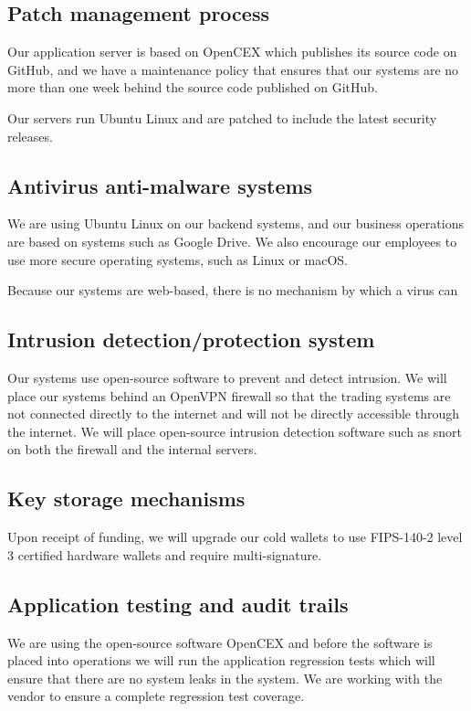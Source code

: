 \subsection{Patch management process}

Our application server is based on OpenCEX which publishes its
source code on GitHub, and we have a maintenance policy that ensures
that our systems are no more than one week behind the source code
published on GitHub.

Our servers run Ubuntu Linux and are patched to include the latest
security releases.

\subsection{Antivirus anti-malware systems}

We are using Ubuntu Linux on our backend systems, and our business
operations are based on systems such as Google Drive.  We also
encourage our employees to use more secure operating systems, such as
Linux or macOS.

Because our systems are web-based, there is no mechanism by which a
virus can 

\subsection{Intrusion detection/protection system}

Our systems use open-source software to prevent and detect intrusion.
We will place our systems behind an OpenVPN firewall so that the
trading systems are not connected directly to the internet and will
not be directly accessible through the internet.  We will place open-source intrusion detection software such as snort on both the firewall
and the internal servers.

\subsection{Key storage mechanisms}
Upon receipt of funding, we will upgrade our cold wallets to use
FIPS-140-2 level 3 certified hardware wallets and require
multi-signature.


\subsection{Application testing and audit trails}
We are using the open-source software OpenCEX and before the software is
placed into operations we will run the application regression tests
which will ensure that there are no system leaks in the system.  We
are working with the vendor to ensure a complete regression test
coverage.

